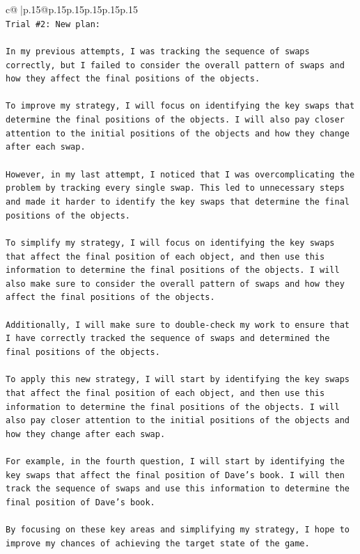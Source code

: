 \documentclass{article}
\begin{document}
{\begin{supertabular}{c@{$\;$}|p{.15\linewidth}@{}p{.15\linewidth}p{.15\linewidth}p{.15\linewidth}p{.15\linewidth}p{.15\linewidth}}
{{{\\ 
\texttt{Trial \#2: New plan: } \\
\\ 
\texttt{In my previous attempts, I was tracking the sequence of swaps correctly, but I failed to consider the overall pattern of swaps and how they affect the final positions of the objects. } \\
\\ 
\texttt{To improve my strategy, I will focus on identifying the key swaps that determine the final positions of the objects. I will also pay closer attention to the initial positions of the objects and how they change after each swap.} \\
\\ 
\texttt{However, in my last attempt, I noticed that I was overcomplicating the problem by tracking every single swap. This led to unnecessary steps and made it harder to identify the key swaps that determine the final positions of the objects.} \\
\\ 
\texttt{To simplify my strategy, I will focus on identifying the key swaps that affect the final position of each object, and then use this information to determine the final positions of the objects. I will also make sure to consider the overall pattern of swaps and how they affect the final positions of the objects.} \\
\\ 
\texttt{Additionally, I will make sure to double{-}check my work to ensure that I have correctly tracked the sequence of swaps and determined the final positions of the objects.} \\
\\ 
\texttt{To apply this new strategy, I will start by identifying the key swaps that affect the final position of each object, and then use this information to determine the final positions of the objects. I will also pay closer attention to the initial positions of the objects and how they change after each swap.} \\
\\ 
\texttt{For example, in the fourth question, I will start by identifying the key swaps that affect the final position of Dave's book. I will then track the sequence of swaps and use this information to determine the final position of Dave's book.} \\
\\ 
\texttt{By focusing on these key areas and simplifying my strategy, I hope to improve my chances of achieving the target state of the game.} \\
}}}
\end{supertabular}}
\end{document}
